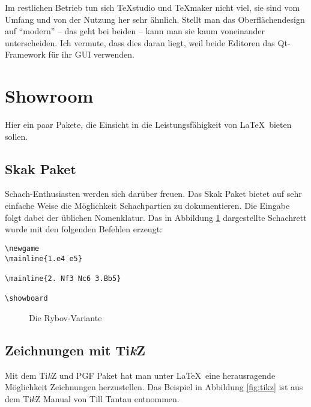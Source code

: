 Im restlichen Betrieb tun sich TeXstudio und TeXmaker nicht viel, sie sind vom Umfang und von der Nutzung her sehr ähnlich. Stellt man das Oberflächendesign auf "`modern"' -- das geht bei beiden -- kann man sie kaum voneinander unterscheiden. Ich vermute, dass dies daran liegt, weil beide Editoren das Qt-Framework für ihr GUI verwenden. 




\section{Showroom}

Hier ein paar Pakete, die Einsicht in die Leistungsfähigkeit von \LaTeX\ bieten sollen.

\subsection{Skak Paket}

Schach-Enthusiasten werden sich darüber freuen. Das Skak Paket bietet auf sehr einfache Weise die Möglichkeit Schachpartien zu dokumentieren. Die Eingabe folgt dabei der üblichen Nomenklatur. Das in Abbildung \ref{fig:rybov} dargestellte Schachrett wurde mit den folgenden Befehlen erzeugt:
\begin{verbatim}
\newgame
\mainline{1.e4 e5}

\mainline{2. Nf3 Nc6 3.Bb5}

\showboard
\end{verbatim}

\bigskip

\newgame
{}


\begin{figure}[h]
\centering
\showboard
\caption{Die Rybov-Variante}
\label{fig:rybov}
\end{figure}

\newpage
\subsection{Zeichnungen mit Ti\textit{k}Z}

Mit dem Ti\textit{k}Z und PGF Paket hat man unter \LaTeX\ eine herausragende Möglichkeit Zeichnungen herzustellen. Das Beispiel in Abbildung \ref{fig:tikz} ist aus dem Ti\textit{k}Z Manual \cite{tikman} von Till Tantau entnommen.

